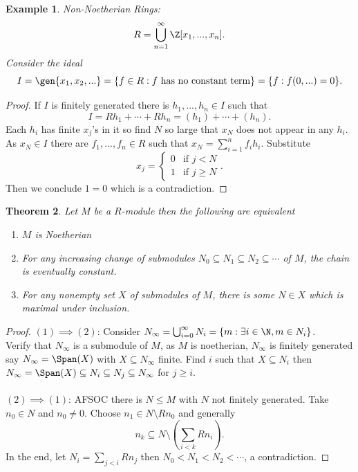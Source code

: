 \documentclass[a4paper,12pt]{article}
\newtheorem{thm}{Theorem}[section]
\newtheorem{eg}[thm]{Example}
\begin{document}
\begin{eg}
    Non-Noetherian Rings:
    \[
    R=\bigcup_{n=1}^\infty \Z[x_1,...,x_n]
    .\] 
    Consider the ideal \[
        I=\gen{x_1,x_2,...}= \{f\in R: f \text{ has no constant term}\}= \{f: f(0,...)=0\}
    .\]
\end{eg}
\begin{proof}
    If $I$ is finitely generated there is $h_1,...,h_n\in I$ such that \[
    I=Rh_1+\cdots+Rh_n=(h_1)+\cdots+(h_n)
    .\] 
    Each $h_i$ has finite $x_j$'s in it so find $N$ so large that $x_N$ does not appear in any $h_i$. \\
    As $x_N\in I$ there are $f_1,...,f_n\in R$ such that $x_N=\sum_{i=1}^n f_i h_i$. Substitute \[
        x_j= \begin{cases}
            0 & \text{if } j<N \\
            1 & \text{if } j\geq N
        \end{cases}
    .\]
    Then we conclude $1=0$ which is a contradiction.
\end{proof}
\begin{thm}
    Let $M$ be a $R$-module then the following are equivalent
    \begin{enumerate}
        \item $M$ is Noetherian
        \item For any increasing change of submodules $N_0\subseteq N_1\subseteq N_2\subseteq \cdots$ of $M$, the chain is eventually constant. 
        \item For any nonempty set $X$ of submodules of $M$, there is some $N\in X$ which is maximal under inclusion.
    \end{enumerate}
\end{thm}
\begin{proof}
    $(1)\implies (2)$: Consider $N_\infty=\bigcup_{i=0}^\infty N_i= \{m: \exists i\in \N, m\in N_i\}$. \\
    Verify that $N_\infty$ is a submodule of $M$, as $M$ is noetherian, $N_\infty$ is finitely generated say $N_\infty=\Span(X)$ with $X\subseteq N_\infty$ finite. Find $i$ such that $X\subseteq N_i$ then $N_\infty=\Span(X)\subseteq N_i\subseteq N_j\subseteq N_\infty$ for $j\geq i$. \\\\
    $(2)\implies (1)$: AFSOC there is $N\leq M$ with $N$ not finitely generated. Take $n_0\in N$ and $n_0\neq 0$. Choose $n_1\in N\setminus Rn_0$ and generally \[
        n_k\subseteq N\setminus \left (\sum_{i<k}R n_i\right )
    .\]
    In the end, let $N_i=\sum_{j<i}R n_j$ then $N_0<N_1<N_2<\cdots$, a contradiction. 
\end{proof}
\newpage
\end{document}

